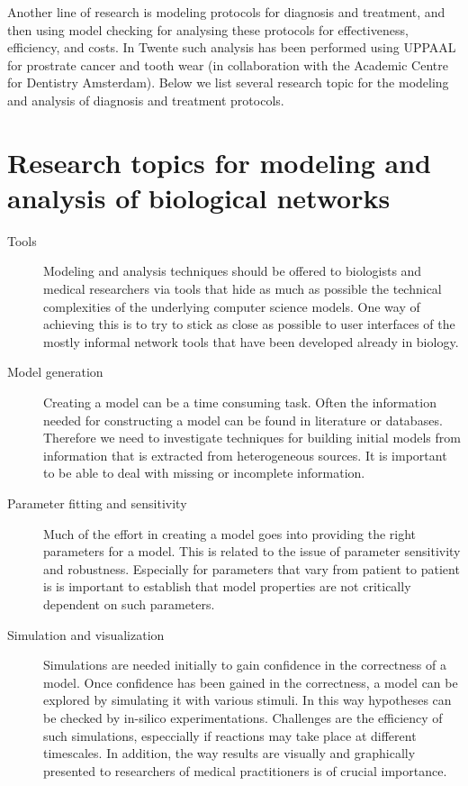\documentclass[sigplan,10pt]{acmart}\settopmatter{printfolios=true,printccs=false,printacmref=false}
\begin{document}
Another line of research is modeling protocols for diagnosis and treatment, and
then using model checking for analysing these protocols for effectiveness,
efficiency,  and costs. In Twente such analysis has been performed using UPPAAL
for prostrate cancer \cite{Schivo:2015,Degeling:2017} and tooth wear
\cite{Rooijen:2018,Choudry:2018} (in collaboration with the Academic Centre for
Dentistry Amsterdam). Below we list several research topic for  the modeling
and analysis of diagnosis and treatment protocols.

\section{Research topics for modeling and analysis of biological networks}


\begin{description}
\item[Tools] Modeling and analysis techniques should be offered to biologists
and medical researchers via tools that hide as much as possible the technical
complexities of the underlying computer science models. One way of achieving
this is to try to stick as close as possible to user interfaces of the mostly
informal network
tools that have been developed already in biology.

\item[Model generation] Creating a model can be a time consuming task. Often
the information needed for constructing a model can be found in literature or
databases.  Therefore we need to investigate techniques for building initial
models from information that is extracted from heterogeneous sources. It is
important to be able to deal with missing or incomplete information.

\item[Parameter fitting and sensitivity] Much of the effort in creating a model
goes into providing the right parameters for a model. This is related to the
issue of parameter sensitivity and robustness. Especially for parameters that
vary from patient to patient is is important to establish that model properties
are not critically dependent on such parameters.

\item[Simulation and visualization] Simulations are needed initially to gain
confidence in the correctness of a model. Once confidence has been gained in
the correctness, a model can be explored by simulating it with various stimuli.
In this way hypotheses can be checked by in-silico experimentations. Challenges
are the efficiency of such simulations, especcially if reactions may take place
at different timescales. In addition, the way results are visually and
graphically presented to
researchers of medical practitioners  is of crucial importance.


\end{description}
\end{document}
